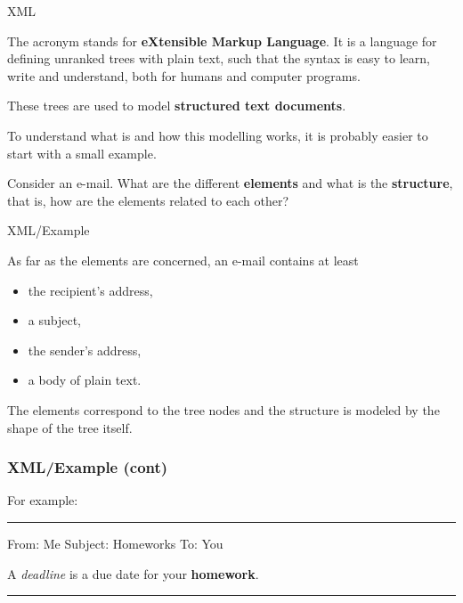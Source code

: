 
%
\begin{frame}{XML}

The acronym \XML stands for \textbf{eXtensible Markup Language}. It is
a language for defining unranked trees with plain text, such that the
syntax is easy to learn, write and understand, both for humans and
computer programs.

\bigskip

These trees are used to model \textbf{structured text documents}.

\bigskip

To understand what \XML is and how this modelling works, it is probably
easier to start with a small example.

\bigskip

Consider an e-mail. What are the different \textbf{elements} and what
is the \textbf{structure}, that is, how are the elements related to
each other?

\end{frame}

%
\begin{frame}{XML/Example}

As far as the elements are concerned, an e-mail contains at least
\begin{itemize}

  \item the recipient's address,

  \item a subject,

  \item the sender's address,

  \item a body of plain text.

\end{itemize}
The elements correspond to the tree nodes and the structure is modeled
by the shape of the tree itself.

\end{frame}

%
\begin{frame}[containsverbatim]
\frametitle{XML/Example (cont)}

For example:

\bigskip

\noindent\rule{\linewidth}{0.5pt}
\begin{semiverbatim}
From: Me
Subject: Homeworks
To: You

  A \emph{deadline} is a due date for your \textbf{homework}.
\end{semiverbatim}
\rule{\linewidth}{0.5pt}

\end{frame}

